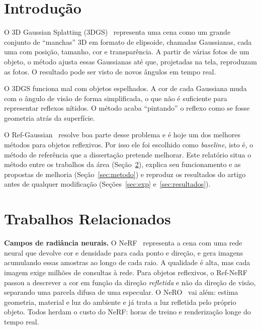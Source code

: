 \documentclass[conference]{IEEEtran}
\begin{document}
\section{Introdução}

O 3D Gaussian Splatting (3DGS)~\cite{kerbl2023} representa uma cena como um grande conjunto de ``manchas'' 3D em formato de elipsoide, chamadas Gaussianas, cada uma com posição, tamanho, cor e transparência. A partir de várias fotos de um objeto, o método ajusta essas Gaussianas até que, projetadas na tela, reproduzam as fotos. O resultado pode ser visto de novos ângulos em tempo real.

O 3DGS funciona mal com objetos espelhados. A cor de cada Gaussiana muda com o ângulo de visão de forma simplificada, o que não é suficiente para representar reflexos nítidos. O método acaba ``pintando'' o reflexo como se fosse geometria atrás da superfície.

O Ref-Gaussian~\cite{yao2025refgaussian} resolve boa parte desse problema e é hoje um dos melhores métodos para objetos reflexivos. Por isso ele foi escolhido como \textit{baseline}, isto é, o método de referência que a dissertação pretende melhorar. Este relatório situa o método entre os trabalhos da área (Seção~\ref{sec:relacionados}), explica seu funcionamento e as propostas de melhoria (Seção~\ref{sec:metodo}) e reproduz os resultados do artigo antes de qualquer modificação (Seções~\ref{sec:exp} e~\ref{sec:resultados}).

\section{Trabalhos Relacionados}\label{sec:relacionados}

\textbf{Campos de radiância neurais.} O NeRF~\cite{mildenhall2020nerf} representa a cena com uma rede neural que devolve cor e densidade para cada ponto e direção, e gera imagens acumulando essas amostras ao longo de cada raio. A qualidade é alta, mas cada imagem exige milhões de consultas à rede. Para objetos reflexivos, o Ref-NeRF~\cite{verbin2022refnerf} passou a descrever a cor em função da direção \emph{refletida} e não da direção de visão, separando uma parcela difusa de uma especular. O NeRO~\cite{liu2023nero} vai além: estima geometria, material e luz do ambiente e já trata a luz refletida pelo próprio objeto. Todos herdam o custo do NeRF: horas de treino e renderização longe do tempo real.
\end{document}
